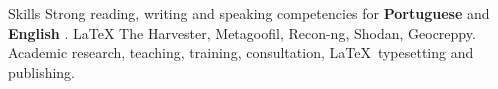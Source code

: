 
\begin{rubric}{Skills}
\entry*[Languages]
	Strong reading, writing and speaking competencies for \textbf{Portuguese} and \textbf{English} .
	\LaTeX
\entry*[Osint]
	The Harvester, Metagoofil, Recon-ng, Shodan, Geocreppy.
\entry*[Misc.]
	Academic research, teaching, training, consultation, \LaTeX\ typesetting and publishing.
\end{rubric}

